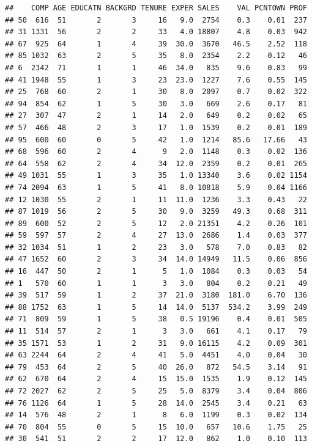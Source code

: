 \documentclass[
]{article}
\begin{document}
\begin{verbatim}
##    COMP AGE EDUCATN BACKGRD TENURE EXPER SALES    VAL PCNTOWN PROF
## 50  616  51       2       3     16   9.0  2754    0.3    0.01  237
## 31 1331  56       2       2     33   4.0 18807    4.8    0.03  942
## 67  925  64       1       4     39  30.0  3670   46.5    2.52  118
## 85 1032  63       2       5     35   8.0  2354    2.2    0.12   46
## 6  2342  71       1       1     46  34.0   835    9.6    0.83   99
## 41 1948  55       1       3     23  23.0  1227    7.6    0.55  145
## 25  768  60       2       1     30   8.0  2097    0.7    0.02  322
## 94  854  62       1       5     30   3.0   669    2.6    0.17   81
## 27  307  47       2       1     14   2.0   649    0.2    0.02   65
## 57  466  48       2       3     17   1.0  1539    0.2    0.01  189
## 95  600  60       0       5     42   1.0  1214   85.6   17.66   43
## 68  596  60       2       4      9   2.0  1148    0.3    0.02  136
## 64  558  62       2       4     34  12.0  2359    0.2    0.01  265
## 49 1031  55       1       3     35   1.0 13340    3.6    0.02 1154
## 74 2094  63       1       5     41   8.0 10818    5.9    0.04 1166
## 12 1030  55       2       1     11  11.0  1236    3.3    0.43   22
## 87 1019  56       2       5     30   9.0  3259   49.3    0.68  311
## 89  600  52       2       5     12   2.0 21351    4.2    0.26  101
## 59  597  57       2       4     27  13.0  2686    1.4    0.03  377
## 32 1034  51       1       2     23   3.0   578    7.0    0.83   82
## 47 1652  60       2       3     34  14.0 14949   11.5    0.06  856
## 16  447  50       2       1      5   1.0  1084    0.3    0.03   54
## 1   570  60       1       1      3   3.0   804    0.2    0.21   49
## 39  517  59       1       2     37  21.0  3180  181.0    6.70  136
## 88 1752  63       1       5     14  14.0  5137  534.2    3.99  249
## 71  809  59       1       5     38   0.5 19196    0.4    0.01  505
## 11  514  57       2       1      3   3.0   661    4.1    0.17   79
## 35 1571  53       1       2     31   9.0 16115    4.2    0.09  301
## 63 2244  64       2       4     41   5.0  4451    4.0    0.04   30
## 79  453  64       2       5     40  26.0   872   54.5    3.14   91
## 62  670  64       2       4     15  15.0  1535    1.9    0.12  145
## 72 2027  62       2       5     25   5.0  8379    3.4    0.04  806
## 76 1126  64       1       5     28  14.0  2545    3.4    0.21   63
## 14  576  48       2       1      8   6.0  1199    0.3    0.02  134
## 70  804  55       0       5     15  10.0   657   10.6    1.75   25
## 30  541  51       2       2     17  12.0   862    1.0    0.10  113

\end{verbatim}
\end{document}

